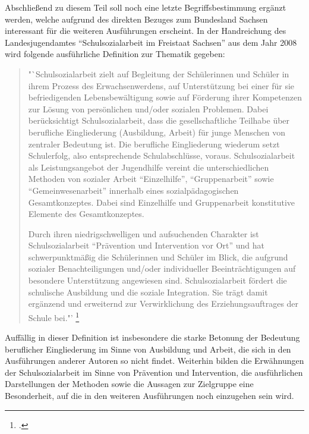 Abschließend zu diesem Teil soll noch eine letzte Begriffsbestimmung ergänzt werden, welche aufgrund des direkten Bezuges zum Bundesland Sachsen interessant für die weiteren Ausführungen erscheint. In der Handreichung des Landesjugendamtes "`Schulsozialarbeit im Freistaat Sachsen"' aus dem Jahr 2008 wird folgende ausführliche Definition zur Thematik gegeben: 

\begin{quotation}
\noindent
"`Schulsozialarbeit zielt auf Begleitung der Schülerinnen und Schüler in ihrem Prozess des Erwachsenwerdens, auf Unterstützung bei einer für sie befriedigenden Lebensbewältigung sowie auf Förderung ihrer Kompetenzen zur Lösung von persönlichen und/oder sozialen Problemen. Dabei berücksichtigt Schulsozialarbeit, dass die gesellschaftliche Teilhabe über berufliche Eingliederung (Ausbildung, Arbeit) für junge Menschen von zentraler Bedeutung ist. Die berufliche Eingliederung wiederum setzt Schulerfolg, also entsprechende Schulabschlüsse, voraus. Schulsozialarbeit als Leistungsangebot der Jugendhilfe vereint die unterschiedlichen Methoden von sozialer Arbeit "`Einzelhilfe"', "`Gruppenarbeit"' sowie "`Gemeinwesenarbeit"' innerhalb eines sozialpädagogischen Gesamtkonzeptes. Dabei sind Einzelhilfe und Gruppenarbeit konstitutive Elemente des Gesamtkonzeptes.

Durch ihren niedrigschwelligen und aufsuchenden Charakter ist Schulsozialarbeit "`Prävention und Intervention vor Ort"' und hat schwerpunktmäßig die Schülerinnen und Schüler im Blick, die aufgrund sozialer Benachteiligungen und/oder individueller Beeinträchtigungen auf besondere Unterstützung angewiesen sind. Schulsozialarbeit fördert die schulische Ausbildung und die soziale Integration. Sie trägt damit ergänzend und erweiternd zur Verwirklichung des Erziehungsauftrages der Schule bei."' \footcite[10]{SMSSSL2008}
\end{quotation}

\noindent
Auffällig in dieser Definition ist insbesondere die starke Betonung der Bedeutung beruflicher Eingliederung im Sinne von Ausbildung und Arbeit, die sich in den Ausführungen anderer Autoren so nicht findet. Weiterhin bilden die Erwähnungen der Schulsozialarbeit im Sinne von Prävention und Intervention, die ausführlichen Darstellungen der Methoden sowie die Aussagen zur Zielgruppe eine Besonderheit, auf die in den weiteren Ausführungen noch einzugehen sein wird. 

